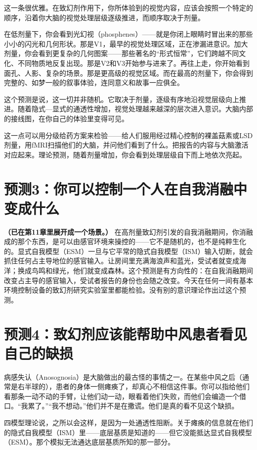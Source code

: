 \documentclass[11pt, twoside, openright]{book}
\begin{document}
这一条很优雅。在致幻剂作用下，你所体验到的视觉内容，应该会按照一个特定的顺序，沿着你大脑的视觉处理层级逐级推进，而顺序取决于剂量。

在低剂量下，你会看到光幻视（phosphenes）------就是你闭上眼睛时冒出来的那些小小的闪光和几何形状。那是V1，最早的视觉处理区域，正在渗漏进意识。加大剂量，你会看到更复杂的几何图案------那些著名的“形式恒常”，它们跨越不同文化、不同物质地反复出现。那是V2和V3开始参与进来了。再往上走，你开始看到面孔、人影、复杂的场景。那是更高级的视觉区域。而在最高的剂量下，你会得到完整的、如梦一般的叙事体验，连同意义和故事一应俱全。

这个预测是说，这一切并非随机。它取决于剂量，逐级有序地沿视觉层级向上推进。随着隐式---显式的通透性增加，视觉处理越来越深的层次进入意识。大脑内部的接线图，在你自己的体验里变得可见。

这一点可以用分级给药方案来检验------给人们服用经过精心控制的裸盖菇素或LSD剂量，用fMRI扫描他们的大脑，并问他们看到了什么。把报告的内容与大脑激活对应起来。理论预测，随着剂量增加，你会看到处理层级自下而上地依次亮起。

\section*{预测3：你可以控制一个人在自我消融中变成什么}

\textbf{（已在第11章里展开成一个场景。）} 在高剂量致幻剂引发的自我消融期间，你消融成的那个东西，是可以由感官环境来操控的------它不是随机的，也不是纯粹生化的。显式自我模型（ESM）一旦与它平常的隐式自我模型（ISM）输入切断，就会抓住任何占主导地位的感官输入。让房间里充满海浪声和蓝光，受试者就变成海洋；换成鸟鸣和绿光，他们就变成森林。这个预测是有方向性的：在自我消融期间改变占主导的感官输入，受试者报告的身份也会随之改变。今天在任何一间有基本环境控制设备的致幻剂研究实验室里都能检验。没有别的意识理论作出过这个预测。

\section*{预测4：致幻剂应该能帮助中风患者看见自己的缺损}

病感失认（Anosognosia）是大脑做出的最古怪的事情之一。在某些中风之后（通常是右半球的），患者的身体一侧瘫痪了，却真心不相信这件事。你可以指给他们看那条一动不动的手臂，让他们动一动，眼看着他们失败，而他们会编造一个借口。“我累了。”“我不想动。”他们并不是在撒谎。他们是真的看不见这个缺损。

四模型理论说，之所以会这样，是因为一处通透性阻断。关于瘫痪的信息就在他们的隐式自我模型（ISM）里------底层基质是知道的------但它没能抵达显式自我模型（ESM）。那个模拟无法通达底层基质所知的那一部分。
\end{document}
